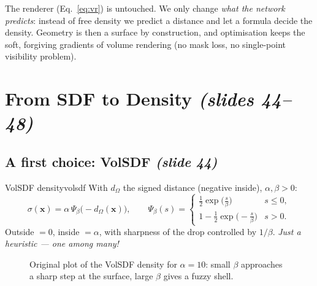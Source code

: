 \documentclass[11pt,a4paper]{article}
\newcommand{\bx}{{\bm{x}}}
\begin{document}
\begin{intuition}
The renderer (Eq.~\eqref{eq:vr}) is untouched. We only change \emph{what the network predicts}: instead of free density
we predict a distance and let a formula decide the density. Geometry is then a surface by construction, and optimisation
keeps the soft, forgiving gradients of volume rendering (no mask loss, no single-point visibility problem).
\end{intuition}

\section{From SDF to Density \emph{(slides 44--48)}}
\subsection{A first choice: VolSDF \emph{(slide 44)}}
\begin{Definition}{VolSDF density}{volsdf}
With $d_\Omega$ the signed distance (negative inside), $\alpha,\beta>0$:
\[
\sigma(\bx)=\alpha\,\Psi_\beta\bigl(-d_\Omega(\bx)\bigr),\qquad
\Psi_\beta(s)=\begin{cases}\tfrac12\exp\!\bigl(\tfrac{s}{\beta}\bigr)& s\le0,\\[2pt]
1-\tfrac12\exp\!\bigl(-\tfrac{s}{\beta}\bigr)& s>0.\end{cases}
\]
Outside $=0$, inside $=\alpha$, with sharpness of the drop controlled by $1/\beta$. \emph{Just a heuristic --- one among many!}
\end{Definition}

\begin{figure}[htbp]
\centering
{}
\caption{Original plot of the VolSDF density for $\alpha=10$: small $\beta$ approaches a sharp step at the surface, large $\beta$ gives a fuzzy shell.}
\end{figure}
\end{document}
